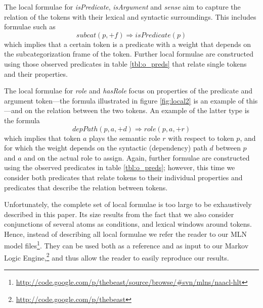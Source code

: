
The local formulae for \emph{isPredicate}, \emph{isArgument} and \emph{sense} aim to capture the relation of the tokens with their lexical and syntactic surroundings. This includes formulae such as 
\[subcat(p,+f) \Rightarrow isPredicate(p)\]
which implies that a certain token is a predicate with a weight that depends on the subcategorization frame of the token. Further local formulae are constructed using those observed predicates in table \ref{tbl:o_preds} that relate single tokens and their properties.

The local formulae for \emph{role} and \emph{hasRole} focus on properties of the predicate and argument token---the formula illustrated in figure \ref{fig:local2} is an example of this---and on the relation between the two tokens. An example of the latter type is the formula
\[depPath(p,a,+d) \Rightarrow role(p,a,+r)\]
which implies that token $a$ plays the semantic role $r$ with respect to token $p$, and for which the weight depends on the syntactic (dependency) path $d$ between $p$ and $a$ and on the actual role to assign. Again, further formulae are constructed using the observed predicates in table \ref{tbl:o_preds}; however, this time we consider both predicates that relate tokens to their individual properties and predicates that describe the relation between tokens.

Unfortunately, the complete set of local formulae is too large to be exhaustively described in this paper. Its size results from the fact that we also consider conjunctions of several atoms as conditions, and lexical windows around tokens. Hence, instead of describing all local formulae we refer the reader
to our MLN model files\footnote{\url{http://code.google.com/p/thebeast/source/browse/\#svn/mlns/naacl-hlt}}. They can be used both as a reference and as input to our Markov Logic
Engine,\footnote{\url{http://code.google.com/p/thebeast}} and thus allow the reader to easily reproduce our results. 

